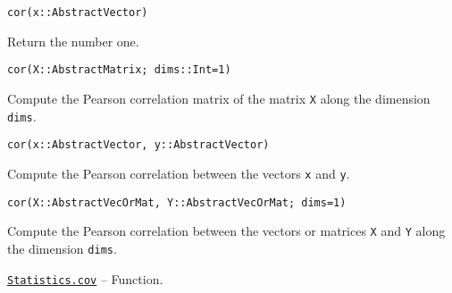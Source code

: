 \begin{adjustwidth}{2em}{0pt}


\begin{verbatim}
cor(x::AbstractVector)
\end{verbatim}

Return the number one.




\begin{lstlisting}
cor(X::AbstractMatrix; dims::Int=1)
\end{lstlisting}

Compute the Pearson correlation matrix of the matrix \texttt{X} along the dimension \texttt{dims}.




\begin{lstlisting}
cor(x::AbstractVector, y::AbstractVector)
\end{lstlisting}

Compute the Pearson correlation between the vectors \texttt{x} and \texttt{y}.




\begin{lstlisting}
cor(X::AbstractVecOrMat, Y::AbstractVecOrMat; dims=1)
\end{lstlisting}

Compute the Pearson correlation between the vectors or matrices \texttt{X} and \texttt{Y} along the dimension \texttt{dims}.



\end{adjustwidth}
\hypertarget{7202855476046698513}{}
\hyperlink{7202855476046698513}{\texttt{Statistics.cov}}  -- {Function.}

